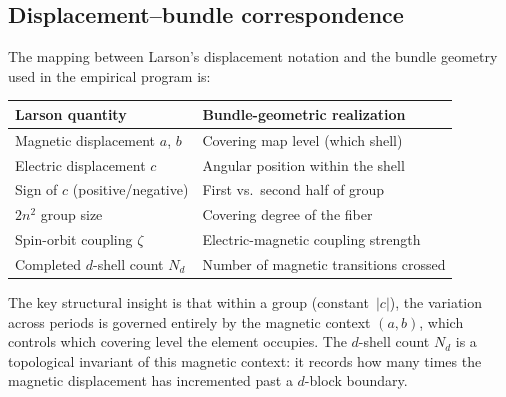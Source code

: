 \documentclass[11pt,a4paper]{article}
\begin{document}
\subsection{Displacement--bundle correspondence}
\label{sec:displacement-bundle}

The mapping between Larson's displacement notation and the bundle geometry used in the empirical program is:

\begin{center}
\renewcommand{\arraystretch}{1.15}
\begin{tabular}{ll}
\toprule
Larson quantity & Bundle-geometric realization \\
\midrule
Magnetic displacement $a$, $b$ & Covering map level (which shell) \\
Electric displacement $c$ & Angular position within the shell \\
Sign of $c$ (positive/negative) & First vs.\ second half of group \\
$2n^2$ group size & Covering degree of the fiber \\
Spin-orbit coupling $\zeta$ & Electric-magnetic coupling strength \\
Completed $d$-shell count $N_d$ & Number of magnetic transitions crossed \\
\bottomrule
\end{tabular}
\end{center}

The key structural insight is that within a group (constant~$|c|$), the variation across periods is governed entirely by the magnetic context $(a, b)$, which controls which covering level the element occupies. The $d$-shell count $N_d$ is a topological invariant of this magnetic context: it records how many times the magnetic displacement has incremented past a $d$-block boundary.
\end{document}
